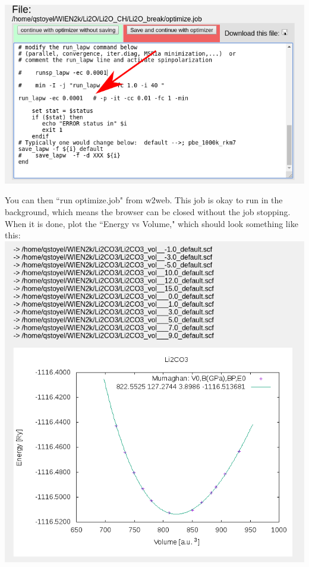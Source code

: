 \documentclass[12pt]{article}
\begin{document}
\includegraphics[scale=0.4]{./images/vol_opt2.png}

You can then ``run optimize.job" from w2web. This job is okay to run in the background, which means the browser can be closed without the job stopping.  When it is done, plot the ``Energy vs Volume," which should look something like this:\\
  
\includegraphics[scale=0.3]{./images/E_vs_V.png}
\end{document}
